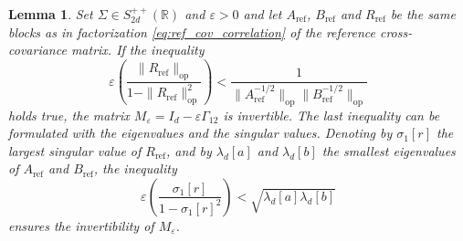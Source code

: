 \documentclass[]{article}
\DeclareMathOperator{\op}{op}
\DeclareMathOperator{\refe}{ref}
\numberwithin{equation}{section}
\theoremstyle{plain}
\newtheorem{lem}{Lemma}[section]
\begin{document}
\begin{lem}\label{lem:invertibility_meps}
	Set $\Sigma \in S_{2d}^{++}(\mathbb{R})$ and $\varepsilon > 0$ and let $A_{\refe}$, $B_{\refe}$ and $R_{\refe}$ be the same blocks as in factorization \eqref{eq:ref_cov_correlation} of the reference cross-covariance matrix. If the inequality  
	\begin{equation}\label{eq:invertible_mat_opnorm}
\varepsilon \left(\frac{   \| R_{\refe}\|_{\op}}{1- \|R_{\refe}\|_{\op}^2} \right)< \frac{1}{\|A_{\refe}^{-1/2}\|_{\op}\|B_{\refe}^{-1/2}\|_{\op}}
	\end{equation}
	holds true, the matrix $M_\varepsilon = I_d-\varepsilon\Gamma_{12}$ is invertible. The last inequality can be formulated with the eigenvalues and the singular values. Denoting by  $\sigma_1[r]$ the largest singular value of $R_{\refe}$, and by $\lambda_d[a]$ and $ \lambda_d[b]$ the smallest eigenvalues of $A_{\refe}$ and $B_{\refe}$, the inequality 
	\begin{equation}\label{eq:inequality_invertible_mat}
		\varepsilon \left(\frac{\sigma_1[r]}{1 -\sigma_1[r]^2} \right) < \sqrt{\lambda_d[a] \lambda_d[b]} 
	\end{equation}
	ensures the invertibility of $M_{\varepsilon}$.
\end{lem}
\end{document}
